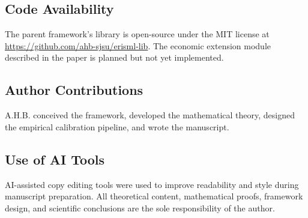 \documentclass[12pt]{article}
\begin{document}
\subsection*{Code Availability}
The parent framework's library is open-source under the MIT license at \url{https://github.com/ahb-sjsu/erisml-lib}.  The economic extension module described in the paper is planned but not yet implemented.

\subsection*{Author Contributions}
A.H.B. conceived the framework, developed the mathematical theory, designed the empirical calibration pipeline, and wrote the manuscript.

\subsection*{Use of AI Tools}
AI-assisted copy editing tools were used to improve readability and style during manuscript preparation.  All theoretical content, mathematical proofs, framework design, and scientific conclusions are the sole responsibility of the author.
\end{document}
